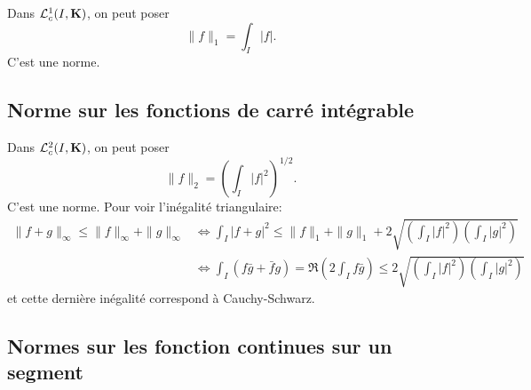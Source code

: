 Dans $\mathcal  L^1_c(I, \mathbf K)$, on peut poser \[
\|f\|_1=\int_I|f|.
\] 
C'est une norme.

\subsection{Norme sur les fonctions de carré intégrable}

Dans $\mathcal  L^2_c(I, \mathbf K)$, on peut poser \[
    \|f\|_2=\left( \int_I|f|^2 \right) ^{1 / 2}.
\] 
C'est une norme. Pour voir l'inégalité triangulaire:
\begin{align*}
    \|f+g\|_{\infty} \leq  \|f\|_\infty+\|g\|_\infty &\iff  \int_I|f+g|^2 \leq \|f\|_1+\|g\|_1 + 2 \sqrt{\left( \int_I|f|^2  \right) \left( \int_I|g|^2  \right) } \\
                                                     &\iff  \int_I(f \bar{g} + \bar{f} g)=\Re\left(2\int_If \bar{g}\right) \leq 2 \sqrt{\left( \int_I|f|^2  \right) \left( \int_I|g|^2  \right) }
\end{align*}
et cette dernière inégalité correspond à Cauchy-Schwarz.

\subsection{Normes sur les fonction continues sur un segment}


